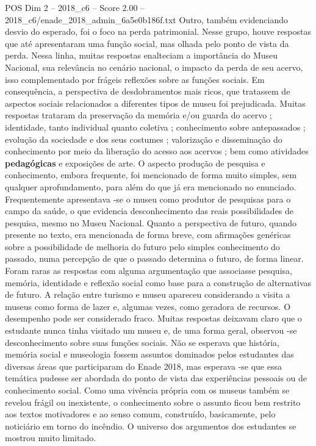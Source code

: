 \begin{textsample}{POS Dim 2 – 2018\_c6 – Score 2.00 – 2018\_c6/enade\_2018\_admin\_6a5e0b186f.txt}
Outro, também evidenciando desvio do esperado, foi o foco na perda patrimonial.
Nesse grupo, houve respostas que até apresentaram uma função social, mas olhada pelo ponto de vista da perda.
Nessa linha, muitas respostas enalteciam a importância do Museu Nacional, sua relevância no cenário nacional, o impacto da perda de seu acervo, isso complementado por frágeis reflexões sobre as funções sociais.
Em consequência, a perspectiva de desdobramentos mais ricos, que tratassem de aspectos sociais relacionados a diferentes tipos de museu foi prejudicada.
Muitas respostas trataram da preservação da memória e/ou guarda do acervo ; identidade, tanto individual quanto coletiva ; conhecimento sobre antepassados ; evolução da sociedade e dos seus costumes ; valorização e disseminação do conhecimento por meio da liberação do acesso aos acervos ; bem como atividades \textbf{pedagógicas} e exposições de arte.
O aspecto produção de pesquisa e conhecimento, embora frequente, foi mencionado de forma muito simples, sem qualquer aprofundamento, para além do que já era mencionado no enunciado.
Frequentemente apresentava -se o museu como produtor de pesquisas para o campo da saúde, o que evidencia desconhecimento das reais possibilidades de pesquisa, mesmo no Museu Nacional.
Quanto a perspectiva de futuro, quando presente no texto, era mencionada de forma breve, com afirmações genéricas sobre a possibilidade de melhoria do futuro pelo simples conhecimento do passado, numa percepção de que o passado determina o futuro, de forma linear.
Foram raras as respostas com alguma argumentação que associasse pesquisa, memória, identidade e reflexão social como base para a construção de alternativas de futuro.
A relação entre turismo e museu apareceu considerando a visita a museus como forma de lazer e, algumas vezes, como geradora de recursos.
O desempenho pode ser considerado fraco.
Muitas respostas deixavam claro que o estudante nunca tinha visitado um museu e, de uma forma geral, observou -se desconhecimento sobre suas funções sociais.
Não se esperava que história, memória social e museologia fossem assuntos dominados pelos estudantes das diversas áreas que participaram do Enade 2018, mas esperava -se que essa temática pudesse ser abordada do ponto de vista das experiências pessoais ou de conhecimento social.
Como uma vivência própria com os museus também se revelou frágil ou inexistente, o conhecimento sobre o assunto ficou bem restrito aos textos motivadores e ao senso comum, construído, basicamente, pelo noticiário em torno do incêndio.
O universo dos argumentos dos estudantes se mostrou muito limitado.

\end{textsample}
